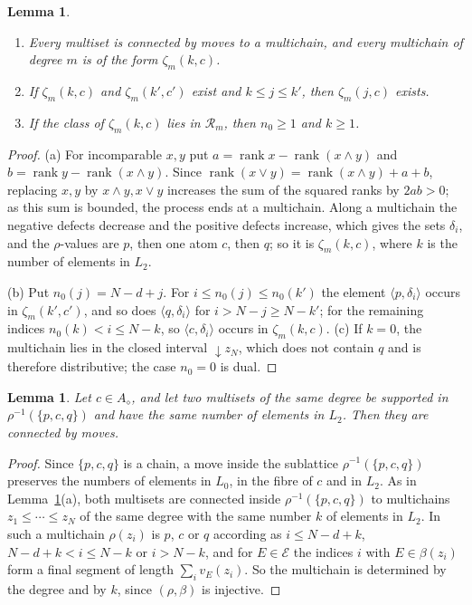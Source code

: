 \documentclass{amsart}
\newtheorem{lemma}[theorem]{Lemma}
\theoremstyle{definition}
\DeclareMathOperator{\rk}{rank}
\newcommand{\cE}{\mathcal E}
\newcommand{\dm}{\diamond}
\begin{document}
\begin{lemma}\label{lem:chains}
\begin{enumerate}
\item[(a)] Every multiset is connected by moves to a multichain, and every multichain of degree $m$ is of the form $\zeta_m(k,c)$.
\item[(b)] If $\zeta_m(k,c)$ and $\zeta_m(k',c')$ exist and $k\le j\le k'$, then $\zeta_m(j,c)$ exists.
\item[(c)] If the class of $\zeta_m(k,c)$ lies in $\mathcal R_m$, then $n_0\ge1$ and $k\ge1$.
\end{enumerate}
\end{lemma}

\begin{proof}
(a) For incomparable $x,y$ put $a=\rk x-\rk(x\wedge y)$ and $b=\rk y-\rk(x\wedge y)$. Since $\rk(x\vee y)=\rk(x\wedge y)+a+b$, replacing $x,y$ by $x\wedge y,x\vee y$ increases the sum of the squared ranks by $2ab>0$; as this sum is bounded, the process ends at a multichain. Along a multichain the negative defects decrease and the positive defects increase, which gives the sets $\delta_i$, and the $\rho$-values are $p$, then one atom $c$, then $q$; so it is $\zeta_m(k,c)$, where $k$ is the number of elements in $L_2$.

(b) Put $n_0(j)=N-d+j$. For $i\le n_0(j)\le n_0(k')$ the element $\langle p,\delta_i\rangle$ occurs in $\zeta_m(k',c')$, and so does $\langle q,\delta_i\rangle$ for $i>N-j\ge N-k'$; for the remaining indices $n_0(k)<i\le N-k$, so $\langle c,\delta_i\rangle$ occurs in $\zeta_m(k,c)$. (c) If $k=0$, the multichain lies in the closed interval ${\downarrow}z_N$, which does not contain $q$ and is therefore distributive; the case $n_0=0$ is dual.
\end{proof}

\begin{lemma}\label{lem:branch}
Let $c\in A_\dm$, and let two multisets of the same degree be supported in $\rho^{-1}(\{p,c,q\})$ and have the same number of elements in $L_2$. Then they are connected by moves.
\end{lemma}

\begin{proof}
Since $\{p,c,q\}$ is a chain, a move inside the sublattice $\rho^{-1}(\{p,c,q\})$ preserves the numbers of elements in $L_0$, in the fibre of $c$ and in $L_2$. As in Lemma~\ref{lem:chains}(a), both multisets are connected inside $\rho^{-1}(\{p,c,q\})$ to multichains $z_1\le\cdots\le z_N$ of the same degree with the same number $k$ of elements in $L_2$. In such a multichain $\rho(z_i)$ is $p$, $c$ or $q$ according as $i\le N-d+k$, $N-d+k<i\le N-k$ or $i>N-k$, and for $E\in\cE$ the indices $i$ with $E\in\beta(z_i)$ form a final segment of length $\sum_iv_E(z_i)$. So the multichain is determined by the degree and by $k$, since $(\rho,\beta)$ is injective.
\end{proof}
\end{document}
